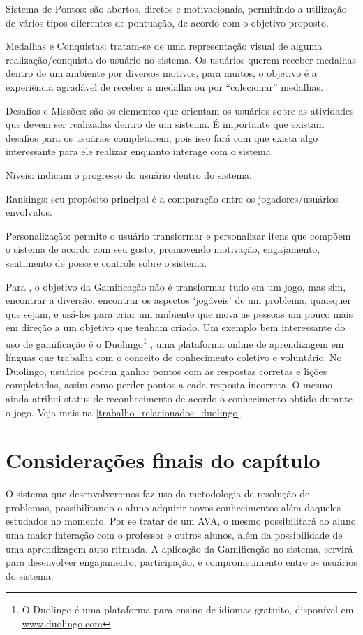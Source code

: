 \begin{alineascomponto}
	\item Sistema de Pontos: são abertos, diretos e motivacionais, permitindo a utilização de vários tipos diferentes de pontuação, de acordo com o objetivo proposto.
	\item Medalhas e Conquistas: tratam-se de uma representação visual de alguma realização/conquista do usuário no sistema. Os usuários querem receber medalhas dentro de um ambiente por diversos 
 motivos, para muitos, o objetivo é a experiência agradável de receber a medalha ou por “colecionar” medalhas.
	\item Desafios e Missões: são os elementos que orientam os usuários sobre as atividades que devem ser realizadas dentro de um sistema. É importante que existam desafios 
para os usuários completarem, pois isso fará com que exista algo interessante para ele realizar enquanto interage com o sistema.
	\item N\'iveis: indicam o progresso do usuário dentro do sistema. 
	\item Rankings: seu propósito principal é a comparação entre os jogadores/usuários envolvidos.
	\item Personalização: permite o usuário transformar e personalizar itens que compõem o sistema de acordo com seu gosto, promovendo motivação, engajamento, sentimento de posse e controle sobre 
o sistema. 
\end{alineascomponto}


Para , o objetivo da Gamificação não é transformar tudo em um jogo, mas sim, encontrar a diversão, encontrar os aspectos `jogáveis' de um problema, quaisquer que 
sejam, e usá-los para criar um ambiente que mova as pessoas um pouco mais em direção a um objetivo que tenham criado. Um exemplo bem interessante do uso de gamificação é o Duolingo\footnote{O 
Duolingo é uma plataforma para ensino de idiomas gratuito, dispon\'ivel em \url{www.duolingo.com} } \cite{von2013duolingo}, uma plataforma online de aprendizagem em línguas que trabalha com o 
conceito de conhecimento coletivo e voluntário. No Duolingo, usuários podem ganhar pontos com as respostas corretas e lições completadas, assim como perder pontos a cada resposta incorreta. O mesmo 
ainda atribui status de reconhecimento de acordo o conhecimento obtido durante o jogo. Veja mais na \autoref{trabalho_relacionados_duolingo}.



\section{Considerações finais do cap\'itulo}

O sistema que desenvolveremos faz uso da metodologia de resolução de problemas, possibilitando o aluno adquirir novos conhecimentos além daqueles estudados no momento. Por se tratar de um AVA, 
o mesmo possibilitará ao aluno uma maior interação com o professor e outros alunos, além da possibilidade de uma aprendizagem auto-ritmada. A aplicação da Gamificação no sistema, servir\'a para 
desenvolver  engajamento, participação, e comprometimento entre os usuários do sistema. 